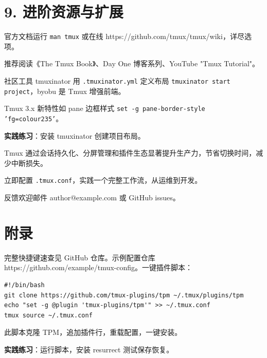 \chapter{9. 进阶资源与扩展}
官方文档运行 \texttt{man tmux} 或在线 https://github.com/tmux/tmux/wiki，详尽选项。\par
推荐阅读《The Tmux Book》、Day One 博客系列、YouTube "Tmux Tutorial"。\par
社区工具 tmuxinator 用 \texttt{.tmuxinator.yml} 定义布局 \texttt{tmuxinator start project}，byobu 是 Tmux 增强前端。\par
Tmux 3.x 新特性如 pane 边框样式 \texttt{set -g pane-border-style 'fg=colour235'}。\par
\textbf{实践练习}：安装 tmuxinator 创建项目布局。\par
Tmux 通过会话持久化、分屏管理和插件生态显著提升生产力，节省切换时间，减少中断损失。\par
立即配置 \texttt{.tmux.conf}，实践一个完整工作流，从运维到开发。\par
反馈欢迎邮件 author@example.com 或 GitHub issues。\par
\chapter{附录}
完整快捷键速查见 GitHub 仓库。示例配置仓库 https://github.com/example/tmux-config。一键插件脚本：\par
\begin{lstlisting}
#!/bin/bash
git clone https://github.com/tmux-plugins/tpm ~/.tmux/plugins/tpm
echo "set -g @plugin 'tmux-plugins/tpm'" >> ~/.tmux.conf
tmux source ~/.tmux.conf
\end{lstlisting}
此脚本克隆 TPM，追加插件行，重载配置，一键安装。\par
\textbf{实践练习}：运行脚本，安装 resurrect 测试保存恢复。\par
